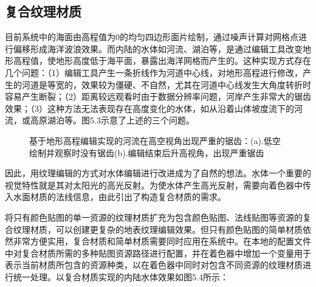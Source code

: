 \subsection{复合纹理材质}
目前系统中的海面由高程值为0的均匀四边形面片绘制，通过噪声计算对网格点进行偏移形成海洋波浪效果。而内陆的水体如河流、湖泊等，是通过编辑工具改变地形高程值，使地形高度低于海平面，暴露出海洋网格而产生的。这种实现方式存在几个问题：（1）编辑工具产生一条折线作为河道中心线，对地形高程进行修改，产生的河道是等宽的，效果较为僵硬、不自然，尤其在河道中心线发生大角度转折时容易产生断裂；（2）距离较远观看时由于数据分辨率问题，河岸产生非常大的锯齿效果；（3）这种方法无法表现存在高度变化的水体，如从沿着山体坡度流下的河流，或高原湖泊等。图5.3示意了上述的三个问题。
\begin{figure}[htb]
    \centering
    \caption{基于地形高程编辑实现的河流在高空视角出现严重的锯齿：(a).低空绘制并观察时没有锯齿(b).编辑结束后升高视角，出现严重锯齿}
\end{figure}
因此，用纹理编辑的方式对水体编辑进行改进成为了自然的想法。水体一个重要的视觉特性就是其对太阳光的高光反射。为使水体产生高光反射，需要向着色器中传入水面材质的法线信息，由此引出了构造复合材质的需求。\par
将只有颜色贴图的单一资源的纹理材质扩充为包含颜色贴图、法线贴图等资源的复合纹理材质，可以创建更复杂的地表纹理编辑效果。但只有颜色贴图的简单材质依然非常方便实用，复合材质和简单材质需要同时应用在系统中。在本地的配置文件中对复合材质所需的多种贴图资源路径进行配置，并在着色器中增加一个变量用于表示当前材质所包含的资源种类，以在着色器中同时对包含不同资源的纹理材质进行统一处理。以复合材质实现的内陆水体效果如图5.4所示：
